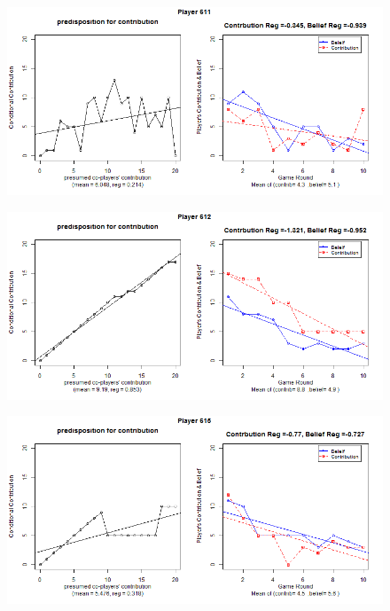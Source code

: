 \begin{figure}[!h]
	\includegraphics[scale=0.5]{images/appendixB/P611.png}
\end{figure}

\begin{figure}[!h]
	\includegraphics[scale=0.5]{images/appendixB/P612.png}
\end{figure}

\begin{figure}[!h]
	\includegraphics[scale=0.5]{images/appendixB/P615.png}
\end{figure}


